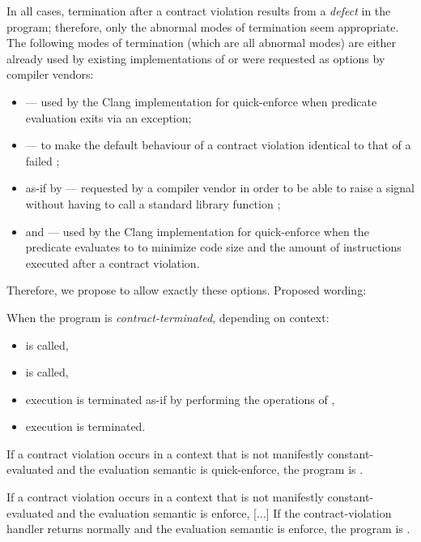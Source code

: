 In all cases, termination after a contract violation results from a \emph{defect} in the program; therefore, only the abnormal modes of termination seem appropriate. The following modes of termination (which are all abnormal modes) are either already used by existing implementations of \cite{P2900R11} or were requested as options by compiler vendors:

\begin{itemize}
\item {} --- used by the Clang implementation for quick-enforce when predicate evaluation exits via an exception;
\item {} --- to make the default behaviour of a contract violation identical to that of a failed ;
\item as-if by  --- requested by a compiler vendor in order to be able to raise a  signal without having to call a standard library function ;
\item {} and  --- used by the Clang implementation for quick-enforce when the predicate evaluates to  to minimize code size and the amount of instructions executed after a contract violation.
\end{itemize}

Therefore, we propose to allow exactly these options. Proposed wording:

\begin{adjustwidth}{0.5cm}{0.5cm}
\begin{addedblock}
When the program is \emph{contract-terminated}, depending on context:
\begin{itemize}
\item {} is called,
\item {} is called,
\item execution is terminated as-if by performing the operations of ,
\item execution is terminated.
\end{itemize}
\end{addedblock}

If a contract violation occurs in a context that is not manifestly constant-evaluated and the evaluation semantic is quick-enforce, the program is .

If a contract violation occurs in a context that is not manifestly constant-evaluated and the evaluation semantic is enforce, [...] If the contract-violation handler returns normally and the evaluation semantic is enforce, the program is .
\end{adjustwidth}

